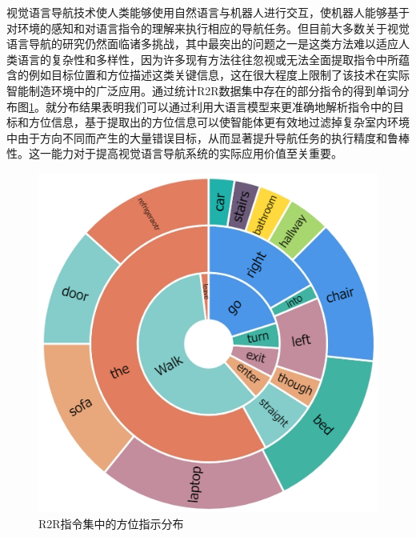 视觉语言导航技术使人类能够使用自然语言与机器人进行交互，使机器人能够基于对环境的感知和对语言指令的理解来执行相应的导航任务。但目前大多数关于视觉语言导航的研究仍然面临诸多挑战，其中最突出的问题之一是这类方法难以适应人类语言的复杂性和多样性，因为许多现有方法往往忽视或无法全面提取指令中所蕴含的例如目标位置和方位描述这类关键信息，这在很大程度上限制了该技术在实际智能制造环境中的广泛应用。通过统计R2R数据集中存在的部分指令的得到单词分布图\ref{instruction_words}。就分布结果表明我们可以通过利用大语言模型来更准确地解析指令中的目标和方位信息，基于提取出的方位信息可以使智能体更有效地过滤掉复杂室内环境中由于方向不同而产生的大量错误目标，从而显著提升导航任务的执行精度和鲁棒性。这一能力对于提高视觉语言导航系统的实际应用价值至关重要。
\begin{figure}[htbp]
    \centering
    \includegraphics[scale=0.65]{Fig/my_instruction_words.png}
    \caption{\label{instruction_words}R2R指令集中的方位指示分布}
\end{figure}

